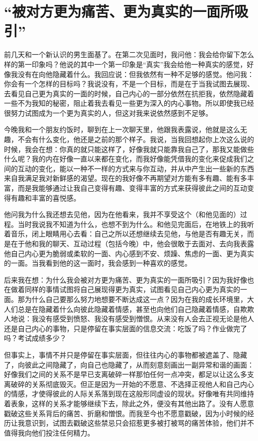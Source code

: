 \chapter{“被对方更为痛苦、更为真实的一面所吸引”}








前几天和一个新认识的男生面基了。在第二次见面时，我问他：我会给你留下怎么样的第一印象吗？他说的其中一个第一印象是“真实”\pozhehao{}我会给他一种真实的感觉，好像我没有在向他隐藏着什么。我回应说：但我依然有一种不足够的感觉。他问我：你会有一个怎样的目标吗？我说没有，不是一个目标，而是在于当我试图去展现、去看见自己更为真实的一面的时候，自己内心的一部分依然在抗拒我，依然隐藏着一些不为我知的秘密，阻止着我去看见一些更为深入的内心事物。所以即使我已经很努力试图成为一个更为真实的人，但这对我来说依然感到不足够。

今晚我和一个朋友约饭时，聊到在上一次聊天里，他跟我表露说，他就是这么无趣，不会有什么变化，他还是之前的那个样子。我说，当我回想起你上次这么说的时候，我会在想：你真的就只能这样了，好像我就只能靠我自己了，那我又能做些什么呢？我的内在好像一直以来都在变化，而我好像能凭借我的变化来促成我们之间的互动的变化，能以一种不一样的方式来与你互动，并从中产生出一些新的东西来自我满足我对新鲜感的渴望。现在的我好像不再期望对方能有多有趣、能有多丰富，而是我能够通过让我自己变得有趣、变得丰富的方式来获得彼此之间的互动变得有趣和丰富的喜悦感。

他问我为什么我还想去见他，因为在他看来，我并不享受这个（和他见面的）过程。当时我说我不知道为什么，也想不到为什么。和他见完面后，在地铁上的我听着音乐，闭上眼睛用心去看：自己之所以还想继续去见他，与他是否有趣无关，而是在于他和我的聊天、互动过程（包括今晚）中，他会很敢于去面对、去向我表露他自己内心更为脆弱或柔软的一面、内心感到不安、烦躁、焦虑的一面、更为真实的一面。当我看到他的这一面时，我会感到一种喜欢的感觉。

后来我在想：为什么我会被对方更为痛苦、更为真实的一面所吸引？因为我好像也在做着同样的事情\pozhehao{}试图将自己展现得更为真实，试图看见自己内心更为真实的一面。那为什么自己要那么努力地想要不断达成这一点？因为在我的成长环境里，大人们总是在隐藏着什么\pozhehao{}向彼此隐藏着情感，甚至也向他们自己隐藏着情感，自欺欺人地说：我没有感受到愤怒、我没有感受到憎恨。从来没有人会去正视无论是他人还是自己内心的事物，只是停留在事实层面的信息交流：吃饭了吗？作业做完了吗？考试成绩多少？

但事实上，事情不并只是停留在事实层面，但往往内心的事物都被遮盖了、隐藏了，向彼此之间隐藏了，向自己也隐藏了，从而刻意刻画出一副异常和谐的画面：好像我们之间的关系不是早已支离破碎一样\pozhehao{}那怕任何一点冲突，都足以让这么多支离破碎的关系彻底毁灭。但正是因为一开始的不愿意、不选择正视他人和自己内心的情感，才使得彼此的人际关系落到现在这般形同虚设的现状。好像唯有共同维持着表象，这样的关系才能够继续下去，除此之外，便没有其他出路了。没有人愿意戳破这些关系背后的痛苦、折磨和憎恨。而我至今也不愿意戳破，因为小时候的经历让我意识到，试图去戳破这些禁忌只会招惹更多被打被骂的痛苦体验，他们并不值得我向他们投注任何精力。

